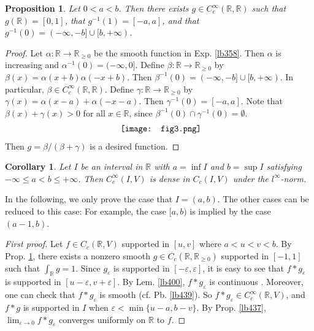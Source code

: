 \documentclass[12pt,b5paper,notitlepage]{article}
\theoremstyle{definition}
\theoremstyle{plain}
\newtheorem{pp}[df]{Proposition}
\newtheorem{co}[df]{Corollary}
\newcommand{\Rbb}{\mathbb R}
\newcommand{\eps}{\varepsilon}
\numberwithin{equation}{section}
\begin{document}
\begin{pp}\label{lb440}
Let $0<a<b$. Then there exists $g\in C_c^\infty(\Rbb,\Rbb)$ such that $g(\Rbb)=[0,1]$, that $g^{-1}(1)=[-a,a]$, and that $g^{-1}(0)=(-\infty,-b]\cup[b,+\infty)$.
\end{pp}



\begin{proof}
Let $\alpha:\Rbb\rightarrow\Rbb_{\geq0}$ be the smooth function in Exp. \ref{lb358}. Then $\alpha$ is increasing and $\alpha^{-1}(0)=(-\infty,0]$.  Define $\beta:\Rbb\rightarrow\Rbb_{\geq0}$ by $\beta(x)=\alpha(x+b)\alpha(-x+b)$. Then $\beta^{-1}(0)=(-\infty,-b]\cup[b,+\infty)$. In particular, $\beta\in C_c^\infty(\Rbb,\Rbb)$. Define $\gamma:\Rbb\rightarrow\Rbb_{\geq0}$ by $\gamma(x)=\alpha(x-a)+\alpha(-x-a)$. Then $\gamma^{-1}(0)=[-a,a]$. Note that $\beta(x)+\gamma(x)>0$ for all $x\in\Rbb$, since $\beta^{-1}(0)\cap\gamma^{-1}(0)=\emptyset$. 
\begin{align*}
\vcenter{\hbox{{
			\texttt{[image: fig3.png]}}}}
\end{align*}
Then $g=\beta/(\beta+\gamma)$ is a desired function.
\end{proof}


\begin{co}\label{lb446}
Let $I$ be an interval in $\Rbb$ with $a=\inf I$ and $b=\sup I$ satisfying $-\infty\leq a<b\leq+\infty$. Then $C_c^\infty(I,V)$ is dense in $C_c(I,V)$ under the $l^\infty$-norm.
\end{co}

In the following, we only prove the case that $I=(a,b)$. The other cases can be reduced to this case: For example, the case $[a,b)$ is implied by the case $(a-1,b)$.

\begin{proof}[First proof]
Let $f\in C_c(\Rbb,V)$ supported in $[u,v]$ where $a<u<v<b$. By Prop. \ref{lb440}, there exists a nonzero smooth $g\in C_c(\Rbb,\Rbb_{\geq0})$ supported in $[-1,1]$ such that $\int_\Rbb g=1$. Since $g_\eps$ is supported in $[-\eps,\eps]$, it is easy to see that $f*g_\eps$ is supported in $[u-\eps,v+\eps]$. By Lem. \ref{lb400}, $f*g_\eps$ is continuous . Moreover, one can check that $f*g_\eps$ is smooth (cf. Pb. \ref{lb439}). So $f*g_\eps\in C_c^\infty(\Rbb,V)$, and $f*g$ is supported in $I$ when $\eps<\min\{u-a,b-v\}$. By Prop. \ref{lb437}, $\lim_{\eps\rightarrow 0}f*g_\eps$ converges uniformly on $\Rbb$ to $f$.
\end{proof}
\end{document}
